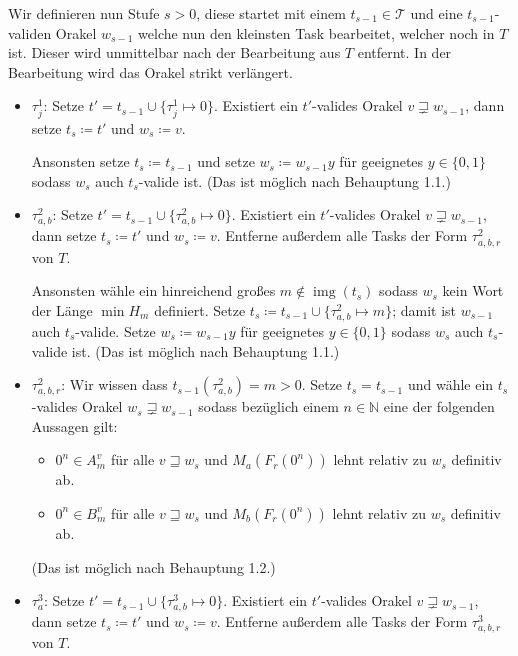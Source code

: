 \documentclass[nofonts]{uebung}
\theoremstyle{definition}
\DeclareMathOperator{\img}{img}
\begin{document}
Wir definieren nun Stufe $s>0$, diese startet mit einem $t_{s-1}\in\mathcal T$ und eine $t_{s-1}$-validen Orakel $w_{s-1}$ welche nun den kleinsten Task bearbeitet, welcher noch in $T$ ist. Dieser wird unmittelbar nach der Bearbeitung aus $T$ entfernt. In der Bearbeitung wird das Orakel strikt verlängert.
\begin{itemize}

    \item $\tau^1_j$: Setze $t'=t_{s-1}\cup\{\tau^1_j\mapsto 0\}$. Existiert ein $t'$-valides Orakel $v\sqsupsetneq w_{s-1}$, dann setze $t_s\coloneqq t'$ und $w_s\coloneqq v$.

        Ansonsten setze $t_s\coloneqq t_{s-1}$ und setze $w_s\coloneqq w_{s-1}y$ für geeignetes $y\in\{0,1\}$ sodass $w_s$ auch $t_s$-valide ist. (Das ist möglich nach Behauptung 1.1.)

    \item $\tau^2_{a,b}$: Setze $t'=t_{s-1}\cup\{\tau^2_{a,b}\mapsto 0\}$. Existiert ein $t'$-valides Orakel $v\sqsupsetneq w_{s-1}$, dann setze $t_s\coloneqq t'$ und $w_s\coloneqq v$. Entferne außerdem alle Tasks der Form $\tau^2_{a,b,r}$ von $T$.

        Ansonsten wähle ein hinreichend großes $m\not\in \img(t_s)$ sodass $w_s$ kein Wort der Länge $\min H_m$ definiert. Setze $t_s\coloneqq t_{s-1}\cup \{ \tau^2_{a,b}\mapsto m \}$; damit ist $w_{s-1}$ auch $t_s$-valide. Setze $w_s\coloneqq w_{s-1}y$ für geeignetes $y\in\{0,1\}$ sodass $w_s$ auch $t_s$-valide ist. (Das ist möglich nach Behauptung 1.1.)

    \item $\tau^2_{a,b,r}$: Wir wissen dass $t_{s-1}(\tau^2_{a,b})=m>0$. Setze $t_s=t_{s-1}$ und wähle ein $t_s$-valides Orakel $w_s\sqsupsetneq w_{s-1}$ sodass bezüglich einem $n\in\mathbb N$ eine der folgenden Aussagen gilt:
        \begin{itemize}[nosep,endpenalty=10000]
            \item $0^n\in A_m^v$ für alle $v\sqsupseteq w_s$ und $M_a(F_r(0^n))$ lehnt relativ zu $w_s$ definitiv ab.
            \item $0^n\in B_m^v$ für alle $v\sqsupseteq w_s$ und $M_b(F_r(0^n))$ lehnt relativ zu $w_s$ definitiv ab.
        \end{itemize} (Das ist möglich nach Behauptung 1.2.)

    \item $\tau^3_{a}$: Setze $t'=t_{s-1}\cup\{\tau^3_{a,b}\mapsto 0\}$. Existiert ein $t'$-valides Orakel $v\sqsupsetneq w_{s-1}$, dann setze $t_s\coloneqq t'$ und $w_s\coloneqq v$. Entferne außerdem alle Tasks der Form $\tau^3_{a,b,r}$ von $T$.


\end{itemize}
\end{document}
